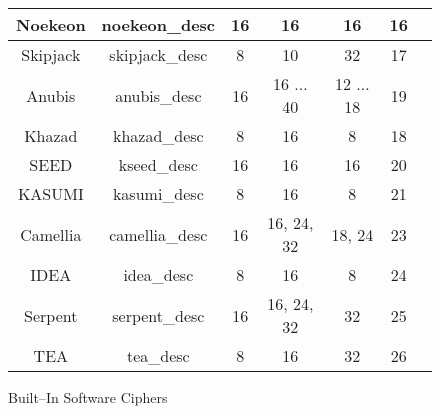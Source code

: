 \documentclass[synpaper]{book}
\begin{document}
\begin{figure}[hpbt]
\begin{small}
\begin{center}
\begin{tabular}{|c|c|c|c|c|c|c|}
     \hline Noekeon & noekeon\_desc & 16 & 16 & 16 & 16 \\
     \hline Skipjack & skipjack\_desc & 8 & 10 & 32 & 17 \\
     \hline Anubis & anubis\_desc & 16 & 16 $\ldots$ 40 & 12 $\ldots$ 18 & 19 \\
     \hline Khazad & khazad\_desc & 8 & 16 & 8 & 18 \\
     \hline SEED   & kseed\_desc & 16 & 16 & 16 & 20 \\
     \hline KASUMI & kasumi\_desc & 8 & 16 & 8 & 21 \\
     \hline Camellia & camellia\_desc & 16 & 16, 24, 32 & 18, 24 & 23 \\
     \hline IDEA & idea\_desc & 8 & 16 & 8 & 24 \\
     \hline Serpent & serpent\_desc & 16 & 16, 24, 32 & 32 & 25 \\
     \hline TEA & tea\_desc & 8 & 16 & 32 & 26 \\
     \hline
\end{tabular}
\end{center}
\end{small}
\caption{Built--In Software Ciphers}
\end{figure}
\end{document}
